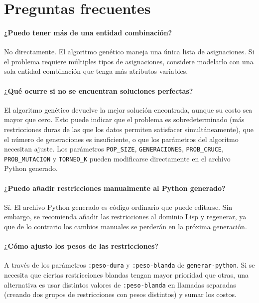 \documentclass[12pt,a4paper]{article}
\newcommand{\code}[1]{\texttt{#1}}
\begin{document}
\section{Preguntas frecuentes}
\label{sec:faq}

\paragraph{¿Puedo tener más de una entidad combinación?}
No directamente. El algoritmo genético maneja una única lista de
asignaciones. Si el problema requiere múltiples tipos de asignaciones,
considere modelarlo con una sola entidad combinación que tenga más
atributos variables.

\paragraph{¿Qué ocurre si no se encuentran soluciones perfectas?}
El algoritmo genético devuelve la mejor solución encontrada, aunque su
costo sea mayor que cero. Esto puede indicar que el problema es
sobredeterminado (más restricciones duras de las que los datos permiten
satisfacer simultáneamente), que el número de generaciones es insuficiente,
o que los parámetros del algoritmo necesitan ajuste. Los parámetros
\code{POP\_SIZE}, \code{GENERACIONES}, \code{PROB\_CRUCE},
\code{PROB\_MUTACION} y \code{TORNEO\_K} pueden modificarse directamente
en el archivo Python generado.

\paragraph{¿Puedo añadir restricciones manualmente al Python generado?}
Sí. El archivo Python generado es código ordinario que puede editarse.
Sin embargo, se recomienda añadir las restricciones al dominio Lisp y
regenerar, ya que de lo contrario los cambios manuales se perderán en
la próxima generación.

\paragraph{¿Cómo ajusto los pesos de las restricciones?}
A través de los parámetros \code{:peso-dura} y \code{:peso-blanda} de
\code{generar-python}. Si se necesita que ciertas restricciones blandas
tengan mayor prioridad que otras, una alternativa es usar distintos
valores de \code{:peso-blanda} en llamadas separadas (creando dos grupos
de restricciones con pesos distintos) y sumar los costos.
\end{document}
